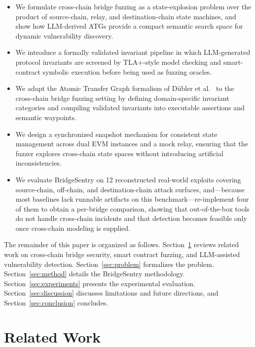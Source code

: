 \documentclass[journal]{IEEEtran}
\begin{document}
\begin{itemize}
    \item We formulate cross-chain bridge fuzzing as a state-explosion problem over the product of source-chain, relay, and destination-chain state machines, and show how LLM-derived ATGs provide a compact semantic search space for dynamic vulnerability discovery.
    \item We introduce a formally validated invariant pipeline in which LLM-generated protocol invariants are screened by TLA+-style model checking and smart-contract symbolic execution before being used as fuzzing oracles.
    \item We adapt the Atomic Transfer Graph formalism of D\"ubler et al.~\cite{dubler2025atg} to the cross-chain bridge fuzzing setting by defining domain-specific invariant categories and compiling validated invariants into executable assertions and semantic waypoints.
    \item We design a synchronized snapshot mechanism for consistent state management across dual EVM instances and a mock relay, ensuring that the fuzzer explores cross-chain state spaces without introducing artificial inconsistencies.
    \item We evaluate BridgeSentry on 12 reconstructed real-world exploits covering source-chain, off-chain, and destination-chain attack surfaces, and---because most baselines lack runnable artifacts on this benchmark---re-implement four of them to obtain a per-bridge comparison, showing that out-of-the-box tools do not handle cross-chain incidents and that detection becomes feasible only once cross-chain modeling is supplied.
\end{itemize}

The remainder of this paper is organized as follows. Section~\ref{sec:related} reviews related work on cross-chain bridge security, smart contract fuzzing, and LLM-assisted vulnerability detection. Section~\ref{sec:problem} formalizes the problem. Section~\ref{sec:method} details the BridgeSentry methodology. Section~\ref{sec:experiments} presents the experimental evaluation. Section~\ref{sec:discussion} discusses limitations and future directions, and Section~\ref{sec:conclusion} concludes.

\section{Related Work}\label{sec:related}
\end{document}
